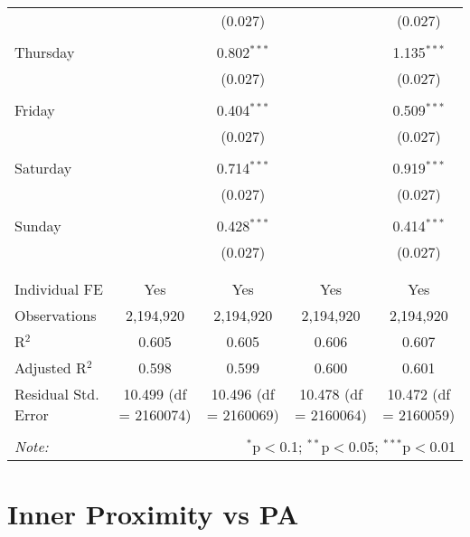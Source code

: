 \documentclass[
]{article}
\begin{document}
\begin{table}[!htbp]
{\begin{tabular}{@{\extracolsep{5pt}}lcccc}
  &  & (0.027) &  & (0.027) \\ 
  & & & & \\ 
 Thursday &  & 0.802$^{***}$ &  & 1.135$^{***}$ \\ 
  &  & (0.027) &  & (0.027) \\ 
  & & & & \\ 
 Friday &  & 0.404$^{***}$ &  & 0.509$^{***}$ \\ 
  &  & (0.027) &  & (0.027) \\ 
  & & & & \\ 
 Saturday &  & 0.714$^{***}$ &  & 0.919$^{***}$ \\ 
  &  & (0.027) &  & (0.027) \\ 
  & & & & \\ 
 Sunday &  & 0.428$^{***}$ &  & 0.414$^{***}$ \\ 
  &  & (0.027) &  & (0.027) \\ 
  & & & & \\ 
\hline \\[-1.8ex] 
Individual FE & Yes & Yes & Yes & Yes \\ 
Observations & 2,194,920 & 2,194,920 & 2,194,920 & 2,194,920 \\ 
R$^{2}$ & 0.605 & 0.605 & 0.606 & 0.607 \\ 
Adjusted R$^{2}$ & 0.598 & 0.599 & 0.600 & 0.601 \\ 
Residual Std. Error & 10.499 (df = 2160074) & 10.496 (df = 2160069) & 10.478 (df = 2160064) & 10.472 (df = 2160059) \\ 
\hline 
\hline \\[-1.8ex] 
\textit{Note:}  & \multicolumn{4}{r}{$^{*}$p$<$0.1; $^{**}$p$<$0.05; $^{***}$p$<$0.01} \\ 
\end{tabular}
} 
\end{table} 
\newpage
\section{Inner Proximity vs PA}
\end{document}
